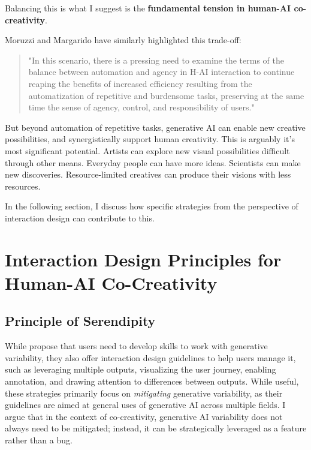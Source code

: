 Balancing this is what I suggest is the \textbf{fundamental tension in human-AI co-creativity}.

Moruzzi and Margarido \cite{Moruzzi2024-cq} have similarly highlighted this trade-off:

\begin{quote}
    "In this scenario, there is a pressing need to examine the terms of the balance between automation and agency in H-AI interaction to continue reaping the benefits of increased efficiency resulting from the automatization of repetitive and burdensome tasks, preserving at the same time the sense of agency, control, and responsibility of users."
\end{quote}

But beyond automation of repetitive tasks, generative AI can enable new creative possibilities, and synergistically support human creativity. This is arguably it's most significant potential. Artists can explore new visual possibilities difficult through other means. Everyday people can have more ideas. Scientists can make new discoveries. Resource-limited creatives can produce their visions with less resources.

In the following section, I discuss how specific strategies from the perspective of interaction design can contribute to this. 

\section{Interaction Design Principles for Human-AI Co-Creativity}

\subsection{Principle of Serendipity}

While \cite{Weisz2024-io} propose that users need to develop skills to work with generative variability, they also offer interaction design guidelines to help users manage it, such as leveraging multiple outputs, visualizing the user journey, enabling annotation, and drawing attention to differences between outputs. While useful, these strategies primarily focus on \textit{mitigating} generative variability, as their guidelines are aimed at general uses of generative AI across multiple fields. I argue that in the context of co-creativity, generative AI variability does not always need to be mitigated; instead, it can be strategically leveraged as a feature rather than a bug.

